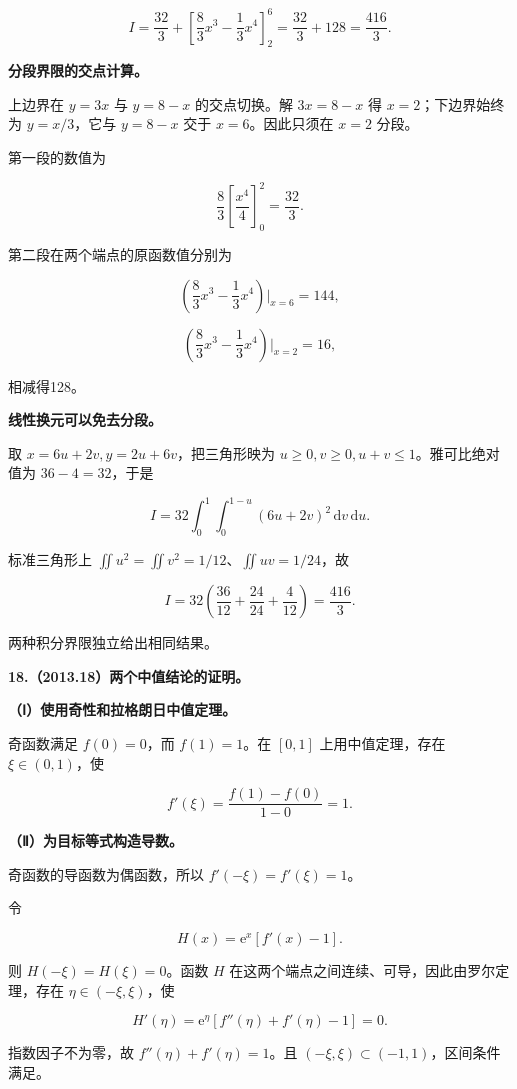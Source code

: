 \documentclass[UTF8,11pt,fontset=windows]{ctexart}
\begin{document}
$$
I=\frac{32}{3}+\left[\frac83x^3-\frac13x^4\right]_2^6
=\frac{32}{3}+128=\frac{416}{3}.
$$

\textbf{分段界限的交点计算。}

上边界在 $y=3x$ 与 $y=8-x$ 的交点切换。解 $3x=8-x$ 得 $x=2$；下边界始终为 $y=x/3$，它与 $y=8-x$ 交于 $x=6$。因此只须在 $x=2$ 分段。

第一段的数值为

$$
\frac83\left[\frac{x^4}{4}\right]_0^2=\frac{32}{3}.
$$

第二段在两个端点的原函数值分别为

$$
\left(\frac83x^3-\frac13x^4\right)\Big|_{x=6}=144,
$$

$$
\left(\frac83x^3-\frac13x^4\right)\Big|_{x=2}=16,
$$

相减得128。

\textbf{线性换元可以免去分段。}

取 $x=6u+2v,y=2u+6v$，把三角形映为 $u\ge0,v\ge0,u+v\le1$。雅可比绝对值为 $36-4=32$，于是

$$
I=32\int_0^1\int_0^{1-u}(6u+2v)^2\,\mathrm dv\,\mathrm du.
$$

标准三角形上 $\iint u^2=\iint v^2=1/12$、$\iint uv=1/24$，故

$$
I=32\left(\frac{36}{12}+\frac{24}{24}+\frac4{12}\right)=\frac{416}{3}.
$$

两种积分界限独立给出相同结果。

\clearpage

\textbf{18.（2013.18）两个中值结论的证明。}

\textbf{（Ⅰ）使用奇性和拉格朗日中值定理。}

奇函数满足 $f(0)=0$，而 $f(1)=1$。在 $[0,1]$ 上用中值定理，存在 $\xi\in(0,1)$，使

$$
f'(\xi)=\frac{f(1)-f(0)}{1-0}=1.
$$

\textbf{（Ⅱ）为目标等式构造导数。}

奇函数的导函数为偶函数，所以 $f'(-\xi)=f'(\xi)=1$。

令

$$
H(x)=\mathrm e^x[f'(x)-1].
$$

则 $H(-\xi)=H(\xi)=0$。函数 $H$ 在这两个端点之间连续、可导，因此由罗尔定理，存在 $\eta\in(-\xi,\xi)$，使

$$
H'(\eta)=\mathrm e^\eta[f''(\eta)+f'(\eta)-1]=0.
$$

指数因子不为零，故 $f''(\eta)+f'(\eta)=1$。且 $(-\xi,\xi)\subset(-1,1)$，区间条件满足。
\end{document}
